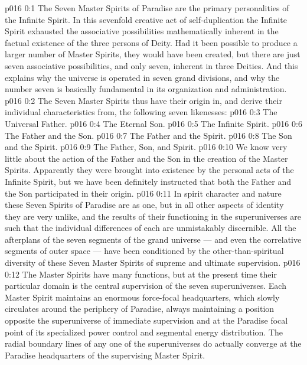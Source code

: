 \author{Universal Censor}
\vs p016 0:1 The Seven Master Spirits of Paradise are the primary personalities of the Infinite Spirit. In this sevenfold creative act of self\hyp{}duplication the Infinite Spirit exhausted the associative possibilities mathematically inherent in the factual existence of the three persons of Deity. Had it been possible to produce a larger number of Master Spirits, they would have been created, but there are just seven associative possibilities, and only seven, inherent in three Deities. And this explains why the universe is operated in seven grand divisions, and why the number seven is basically fundamental in its organization and administration.
\vs p016 0:2 The Seven Master Spirits thus have their origin in, and derive their individual characteristics from, the following seven likenesses:
\vs p016 0:3 \bibnobreakspace The Universal Father.
\vs p016 0:4 \bibnobreakspace The Eternal Son.
\vs p016 0:5 \bibnobreakspace The Infinite Spirit.
\vs p016 0:6 \bibnobreakspace The Father and the Son.
\vs p016 0:7 \bibnobreakspace The Father and the Spirit.
\vs p016 0:8 \bibnobreakspace The Son and the Spirit.
\vs p016 0:9 \bibnobreakspace The Father, Son, and Spirit.
\vs p016 0:10 \pc We know very little about the action of the Father and the Son in the creation of the Master Spirits. Apparently they were brought into existence by the personal acts of the Infinite Spirit, but we have been definitely instructed that both the Father and the Son participated in their origin.
\vs p016 0:11 In spirit character and nature these Seven Spirits of Paradise are as one, but in all other aspects of identity they are very unlike, and the results of their functioning in the superuniverses are such that the individual differences of each are unmistakably discernible. All the afterplans of the seven segments of the grand universe --- and even the correlative segments of outer space --- have been conditioned by the other\hyp{}than\hyp{}spiritual diversity of these Seven Master Spirits of supreme and ultimate supervision.
\vs p016 0:12 The Master Spirits have many functions, but at the present time their particular domain is the central supervision of the seven superuniverses. Each Master Spirit maintains an enormous force\hyp{}focal headquarters, which slowly circulates around the periphery of Paradise, always maintaining a position opposite the superuniverse of immediate supervision and at the Paradise focal point of its specialized power control and segmental energy distribution. The radial boundary lines of any one of the superuniverses do actually converge at the Paradise headquarters of the supervising Master Spirit.
